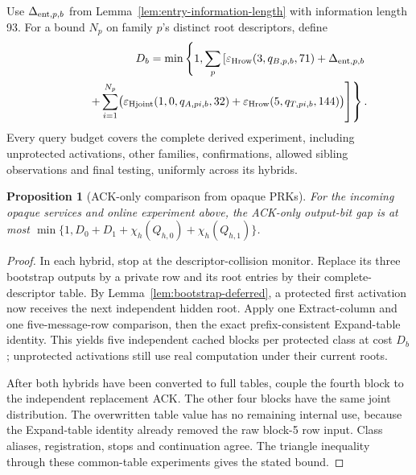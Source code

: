 \documentclass[pdflatex]{sn-jnl}
\theoremstyle{thmstyleone}
\newtheorem{proposition}[theorem]{Proposition}
\theoremstyle{thmstylethree}
\theoremstyle{thmstyletwo}
\begin{document}
Use $\Delta_{{\rm ent},p,b}$ from
Lemma~\ref{lem:entry-information-length} with information length 93.
For a bound $N_p$ on family $p$'s distinct root descriptors, define
\begin{equation}
 \begin{split}
 D_b=\min\left\{1,\sum_p\left[
   \varepsilon_{\rm Hrow}(3,q_{B,p,b},71)
     +\Delta_{{\rm ent},p,b}\right.\right.\\
 \left.\left.\hspace{12mm}
  +\sum_{i=1}^{N_p}\bigl(
      \varepsilon_{\rm Hjoint}(1,0,q_{A,pi,b},32)
      +\varepsilon_{\rm Hrow}(5,q_{T,pi,b},144)\bigr)
       \right]\right\}.
 \end{split}
 \label{eq:bootstrap-tail}
\end{equation}
Every query budget covers the complete derived experiment, including
unprotected activations, other families, confirmations, allowed sibling
observations and final testing, uniformly across its hybrids.

\begin{proposition}[ACK-only comparison from opaque PRKs]
\label{prop:bootstrap-ack-table}
For the incoming opaque services and online experiment above, the
ACK-only output-bit gap is at most
$\min\{1,D_0+D_1+\chi_h(Q_{h,0})+\chi_h(Q_{h,1})\}$.
\end{proposition}
\begin{proof}
In each hybrid, stop at the descriptor-collision monitor. Replace its
three bootstrap outputs by a private row and its root entries by their
complete-descriptor table. By Lemma~\ref{lem:bootstrap-deferred}, a
protected first activation now receives the next independent hidden
root. Apply one Extract-column and one five-message-row comparison,
then the exact prefix-consistent Expand-table identity. This yields
five independent cached blocks per protected class at cost $D_b$;
unprotected activations still use real computation under their current roots.

After both hybrids have been converted to full tables, couple the fourth
block to the independent replacement ACK. The other four blocks have the
same joint distribution.
The overwritten table value has no remaining internal use, because the
Expand-table identity already removed the raw block-5 row input.
Class aliases, registration, stops and continuation agree. The triangle
inequality through these common-table experiments gives the stated bound.
\end{proof}
\end{document}

